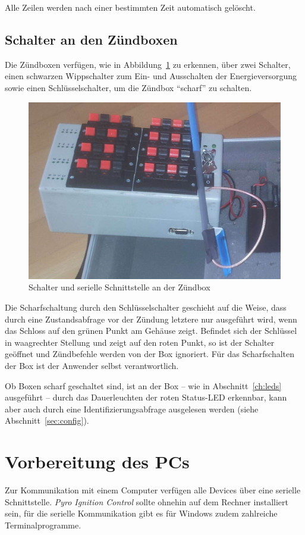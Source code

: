 \documentclass[pdftex, parskip, numbers=noenddot, toc=listof]{scrbook}
\newcommand{\pic}{\emph{Pyro Ignition Control}}
\begin{document}
			Alle Zeilen werden nach einer bestimmten Zeit automatisch gelöscht.


		\section{Schalter an den Zündboxen}

			Die Zündboxen verfügen, wie in Abbildung~\ref{fig:schalterzuend} zu erkennen, über zwei Schalter, einen schwarzen Wippschalter zum Ein- und Ausschalten der Energieversorgung sowie einen Schlüsselschalter, um die Zündbox \enquote{scharf} zu schalten.

			\begin{figure}[!b]
				\centering
				\includegraphics[width=.6\textwidth]{Bilder/SchalterZuendbox}
				\caption{Schalter und serielle Schnittstelle an der Zündbox}
				\label{fig:schalterzuend}
			\end{figure}

			Die Scharfschaltung durch den Schlüsselschalter geschieht auf die Weise, dass durch eine Zustandsabfrage vor der Zündung letztere nur ausgeführt wird, wenn das Schloss auf den grünen Punkt am Gehäuse zeigt. Befindet sich der Schlüssel in waagrechter Stellung und zeigt auf den roten Punkt, so ist der Schalter geöffnet und Zündbefehle werden von der Box ignoriert. Für das Scharfschalten der Box ist der Anwender selbst verantwortlich.

			Ob Boxen scharf geschaltet sind, ist an der Box -- wie in Abschnitt~\ref{ch:leds} ausgeführt -- durch das Dauerleuchten der roten Status-LED erkennbar, kann aber auch durch eine Identifizierungsabfrage ausgelesen werden (siehe Abschnitt~\ref{sec:config}).


	\chapter{Vorbereitung des PCs}

		Zur Kommunikation mit einem Computer verfügen alle Devices über eine serielle Schnittstelle. {\pic} sollte ohnehin auf dem Rechner installiert sein, für die serielle Kommunikation gibt es für Windows zudem zahlreiche Terminalprogramme.
\end{document}

